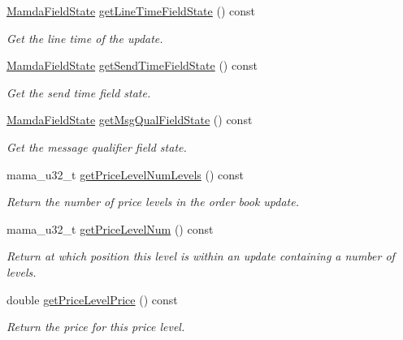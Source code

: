\begin{CompactItemize}
\hyperlink{namespaceWombat_93aac974f2ab713554fd12a1fa3b7d2a}{Mamda\-Field\-State} \hyperlink{classWombat_1_1MamdaBookAtomicListener_74f25a0ce9a9b71b44d482017457e260}{get\-Line\-Time\-Field\-State} () const 
\begin{CompactList}\small\item\em Get the line time of the update. \item\end{CompactList}\item 
\hyperlink{namespaceWombat_93aac974f2ab713554fd12a1fa3b7d2a}{Mamda\-Field\-State} \hyperlink{classWombat_1_1MamdaBookAtomicListener_158632d4f501353404c44410f71555c4}{get\-Send\-Time\-Field\-State} () const 
\begin{CompactList}\small\item\em Get the send time field state. \item\end{CompactList}\item 
\hyperlink{namespaceWombat_93aac974f2ab713554fd12a1fa3b7d2a}{Mamda\-Field\-State} \hyperlink{classWombat_1_1MamdaBookAtomicListener_fb7817c15ad089fe8840f16acf6a89d6}{get\-Msg\-Qual\-Field\-State} () const 
\begin{CompactList}\small\item\em Get the message qualifier field state. \item\end{CompactList}\item 
mama\_\-u32\_\-t \hyperlink{classWombat_1_1MamdaBookAtomicListener_b7b3fe18e82667b4ab2db1b10c535b30}{get\-Price\-Level\-Num\-Levels} () const 
\begin{CompactList}\small\item\em Return the number of price levels in the order book update. \item\end{CompactList}\item 
mama\_\-u32\_\-t \hyperlink{classWombat_1_1MamdaBookAtomicListener_0e9aca6717995e413ba7038d38be5f63}{get\-Price\-Level\-Num} () const 
\begin{CompactList}\small\item\em Return at which position this level is within an update containing a number of levels. \item\end{CompactList}\item 
double \hyperlink{classWombat_1_1MamdaBookAtomicListener_7139c6ddcae27c429e7dade0c5e91358}{get\-Price\-Level\-Price} () const 
\begin{CompactList}\small\item\em Return the price for this price level. \item\end{CompactList}\item 

\end{CompactItemize}
